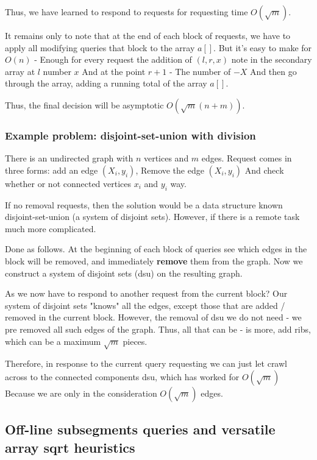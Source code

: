Thus, we have learned to respond to requests for requesting time $O (\sqrt {m})$.

It remains only to note that at the end of each block of requests, we have to apply all modifying queries that block to the array $a []$. But it's easy to make for $O (n)$ - Enough for every request the addition of $(l, r, x)$ note in the secondary array at $l$ number $x$ And at the point $r +1$ - The number of $-X$ And then go through the array, adding a running total of the array $a []$.

Thus, the final decision will be asymptotic $O (\sqrt {m} (n + m))$.

\subsubsection{ Example problem: disjoint-set-union with division }

There is an undirected graph with $n$ vertices and $m$ edges. Request comes in three forms: add an edge $(X_i, y_i)$, Remove the edge $(X_i, y_i)$ And check whether or not connected vertices $x_i$ and $y_i$ way.

If no removal requests, then the solution would be a data structure known disjoint-set-union (a system of disjoint sets). However, if there is a remote task much more complicated.

Done as follows. At the beginning of each block of queries see which edges in the block will be removed, and immediately \textbf{remove} them from the graph. Now we construct a system of disjoint sets (dsu) on the resulting graph.

As we now have to respond to another request from the current block? Our system of disjoint sets "knows" all the edges, except those that are added / removed in the current block. However, the removal of dsu we do not need - we pre removed all such edges of the graph. Thus, all that can be - is more, add ribs, which can be a maximum $\sqrt {m}$ pieces.

Therefore, in response to the current query requesting we can just let crawl across to the connected components dsu, which has worked for $O (\sqrt {m})$ Because we are only in the consideration $O (\sqrt {m})$ edges.

\subsection{ Off-line subsegments queries and versatile array sqrt heuristics }

